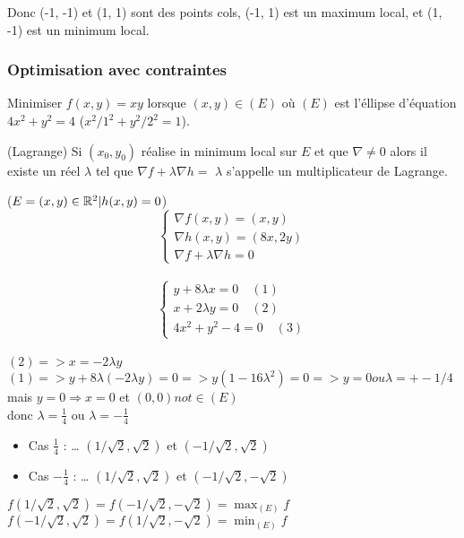 	Donc (-1, -1) et (1, 1) sont des points cols, (-1, 1) est un maximum local, et (1, -1) est un minimum local.
	
	
		\subsubsection{Optimisation avec contraintes}
		
		Minimiser $f(x, y) = xy$ lorsque $(x, y) \in (E)$ où $(E)$ est l'éllipse d'équation $4x^2+y^2=4$ ($x^2/1^2 + y^2/2^2 = 1$).
		
		\begin{theoreme} (Lagrange)
		Si $(x_0, y_0)$ réalise in minimum local sur $E$ et que $\nabla \neq 0$ alors il existe un réel $\lambda$ tel que $\nabla f + \lambda \nabla h = $
		$\lambda$ s'appelle un multiplicateur de Lagrange.
		\end{theoreme}
		
		($E = {(x, y) \in \mathbb{R}^2 | h(x, y) = 0}$)\\
		\[\begin{cases} \nabla f(x, y) = ( x, y) \\ \nabla h(x, y) = (8x, 2y)\\ \nabla f + \lambda \nabla h = 0 \end{cases} \] \\
		\[\begin{cases} y+8\lambda x=0 \quad(1) \\ x+2\lambda y=0 \quad(2) \\ 4x^2+y^2-4=0 \quad(3)\end{cases}\] \\
		$(2) => x = -2\lambda y$ \\
		$(1) => y+8\lambda (-2\lambda y) = 0 => y(1-16 \lambda^2) = 0 => y=0 ou \lambda = +- 1/4$ \\
		mais $y=0 \Rightarrow x=0$ et $(0, 0) not \in (E)$ \\
		donc $\lambda = \frac{1}{4}$ ou $\lambda = -\frac{1}{4}$
		
		\begin{itemize}
		\item Cas $\frac{1}{4}$ : 
		\dots
		$(1/ \sqrt{2}, \sqrt{2})$ et $(-1/ \sqrt{2}, \sqrt{2})$
		\item Cas $-\frac{1}{4}$ : 
		\dots
		$(1/ \sqrt{2}, \sqrt{2})$ et $(-1/ \sqrt{2}, -\sqrt{2})$
		\end{itemize}
		
		$f(1/ \sqrt{2}, \sqrt{2}) = f(-1/ \sqrt{2}, -\sqrt{2}) = \max_{(E)} f$
		$f(-1/ \sqrt{2}, \sqrt{2}) = f(1/ \sqrt{2}, -\sqrt{2}) = \min_{(E)} f$
		
